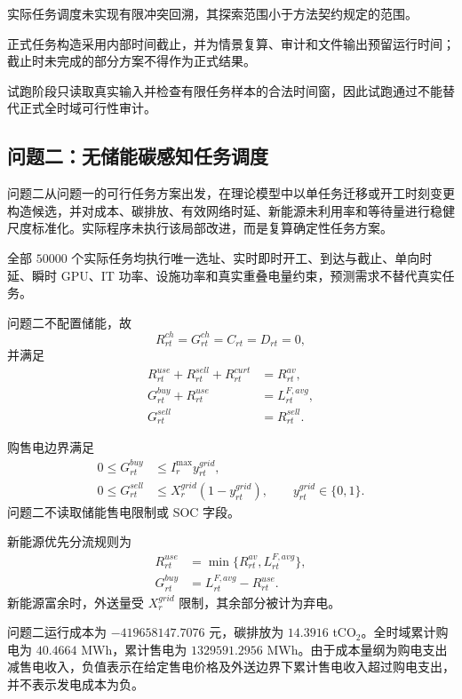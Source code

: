 \documentclass[withoutpreface,bwprint]{cumcmthesis}
\begin{document}
实际任务调度未实现有限冲突回溯，其探索范围小于方法契约规定的范围。

正式任务构造采用内部时间截止，并为情景复算、审计和文件输出预留运行时间；截止时未完成的部分方案不得作为正式结果。

试跑阶段只读取真实输入并检查有限任务样本的合法时间窗，因此试跑通过不能替代正式全时域可行性审计。

\subsection{问题二：无储能碳感知任务调度}

问题二从问题一的可行任务方案出发，在理论模型中以单任务迁移或开工时刻变更构造候选，并对成本、碳排放、有效网络时延、新能源未利用率和等待量进行稳健尺度标准化。实际程序未执行该局部改进，而是复算确定性任务方案。

全部 $50000$ 个实际任务均执行唯一选址、实时即时开工、到达与截止、单向时延、瞬时 GPU、IT 功率、设施功率和真实重叠电量约束，预测需求不替代真实任务。

问题二不配置储能，故
\begin{equation}
R_{rt}^{ch}=G_{rt}^{ch}=C_{rt}=D_{rt}=0,
\end{equation}
并满足
\begin{align}
R_{rt}^{use}+R_{rt}^{sell}+R_{rt}^{curt}&=R_{rt}^{av},\\
G_{rt}^{buy}+R_{rt}^{use}&=L_{rt}^{F,avg},\\
G_{rt}^{sell}&=R_{rt}^{sell}.
\end{align}

购售电边界满足
\begin{align}
0\le G_{rt}^{buy}&\le I_r^{\max}y_{rt}^{grid},\\
0\le G_{rt}^{sell}&\le X_r^{grid}(1-y_{rt}^{grid}),
\qquad y_{rt}^{grid}\in\{0,1\}.
\end{align}
问题二不读取储能售电限制或 SOC 字段。

新能源优先分流规则为
\begin{align}
R_{rt}^{use}&=\min\{R_{rt}^{av},L_{rt}^{F,avg}\},\\
G_{rt}^{buy}&=L_{rt}^{F,avg}-R_{rt}^{use}.
\end{align}
新能源富余时，外送量受 $X_r^{grid}$ 限制，其余部分被计为弃电。

问题二运行成本为 $-419658147.7076$ 元，碳排放为 $14.3916$ tCO$_2$。全时域累计购电为 $40.4664$ MWh，累计售电为 $1329591.2956$ MWh。由于成本量纲为购电支出减售电收入，负值表示在给定售电价格及外送边界下累计售电收入超过购电支出，并不表示发电成本为负。
\end{document}
